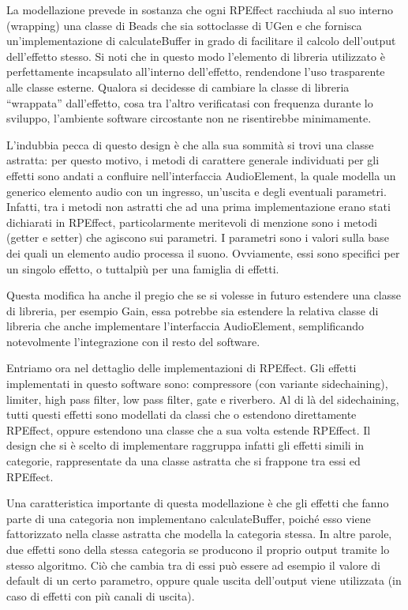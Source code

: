 \documentclass[a4paper,12pt]{report}
\begin{document}
La modellazione prevede in sostanza che ogni RPEffect racchiuda al suo interno (wrapping) una classe di Beads che sia sottoclasse di UGen e che fornisca un’implementazione di calculateBuffer in grado di facilitare il calcolo dell’output dell’effetto stesso. Si noti che in questo modo l’elemento di libreria utilizzato è perfettamente incapsulato all’interno dell’effetto, rendendone l’uso trasparente alle classe esterne. Qualora si decidesse di cambiare la classe di libreria “wrappata” dall’effetto, cosa tra l’altro verificatasi con frequenza durante lo sviluppo, l’ambiente software circostante non ne risentirebbe minimamente. 

L’indubbia pecca di questo design è che alla sua sommità si trovi una classe astratta: per questo motivo, i metodi di carattere generale individuati per gli effetti sono andati a confluire nell’interfaccia AudioElement, la quale modella un generico elemento audio con un ingresso, un’uscita e degli eventuali parametri. Infatti, tra i metodi non astratti che ad una prima implementazione erano stati dichiarati in RPEffect, particolarmente meritevoli di menzione sono i metodi (getter e setter) che agiscono sui parametri. I parametri sono i valori sulla base dei quali un elemento audio processa il suono. Ovviamente, essi sono specifici per un singolo effetto, o tuttalpiù per una famiglia di effetti. 

Questa modifica ha anche il pregio che se si volesse in futuro estendere una classe di libreria, per esempio Gain, essa potrebbe sia estendere la relativa classe di libreria che anche implementare l’interfaccia AudioElement, semplificando notevolmente l’integrazione con il resto del software.
 
Entriamo ora nel dettaglio delle implementazioni di RPEffect.
Gli effetti implementati in questo software sono: compressore (con variante sidechaining), limiter, high pass filter, low pass filter, gate e riverbero. 
Al di là del sidechaining, tutti questi effetti sono modellati da classi che o estendono direttamente RPEffect, oppure estendono una classe che a sua volta estende RPEffect. Il design che si è scelto di implementare raggruppa infatti gli effetti simili in categorie, rappresentate da una classe astratta che si frappone tra essi ed RPEffect. 

Una caratteristica importante di questa modellazione è che gli effetti che fanno parte di una categoria non implementano calculateBuffer, poiché esso viene fattorizzato nella classe astratta che modella la categoria stessa. In altre parole, due effetti sono della stessa categoria se producono il proprio output tramite lo stesso algoritmo. Ciò che cambia tra di essi può essere ad esempio il valore di default di un certo parametro, oppure quale uscita dell’output viene utilizzata (in caso di effetti con più canali di uscita).
\end{document}
